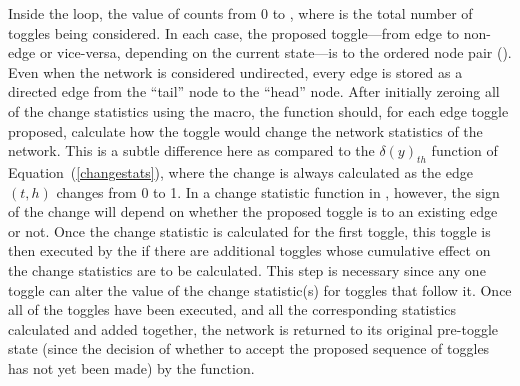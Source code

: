 \documentclass[nojss]{jss}
\begin{document}
Inside the  loop, the value of 
counts from 0 to , where  is the total number of
toggles being considered.  In each case, the proposed toggle---from edge to non-edge
or vice-versa, depending on the current state---is to the
ordered node pair ().  
Even when the network is considered undirected,
every edge is stored as a directed edge from the ``tail'' node to the ``head'' node.
After initially zeroing all of the change statistics using the
 macro, the function should, for each edge
toggle proposed, calculate how the toggle would change the network statistics of the
network.  This is a subtle difference here as compared to  the $\delta(y)_{th}$ function of
Equation~(\ref{changestats}), where the change is always calculated as the edge $(t,h)$
changes from 0 to 1.  In a change statistic function in , however, the sign of the
change will depend on whether the proposed toggle is to an existing edge or not.
Once the change statistic is calculated for the first toggle, this toggle is then
executed by the  
if there are additional toggles
whose cumulative effect on the change statistics are to be calculated.  This step
is necessary since any one toggle can alter the value of the change statistic(s)
for toggles that follow it.  Once all of the toggles have been executed, and all
the corresponding statistics calculated and added together, the network
is returned to its original pre-toggle state (since the decision of whether to accept the
proposed sequence of toggles has not yet been made) by the 
 function.
\end{document}
